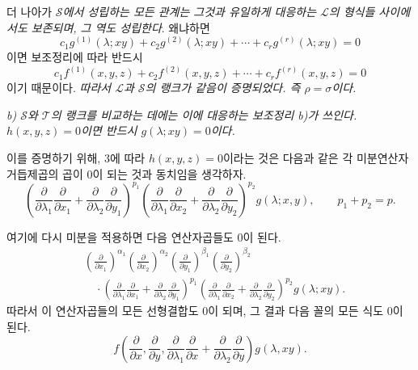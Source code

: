 더 나아가 \emph{$\mathcal S$에서 성립하는 모든 관계는 그것과 유일하게 대응하는 $\mathcal L$의 형식들 사이에서도 보존되며, 그 역도 성립한다}. 왜냐하면
\[
  c_1g^{(1)}(\lambda;xy)+c_2g^{(2)}(\lambda;xy)+\cdots+c_rg^{(r)}(\lambda;xy)=0
\]
이면 보조정리에 따라 반드시
\[
  c_1f^{(1)}(x,y,z)+c_2f^{(2)}(x,y,z)+\cdots+c_rf^{(r)}(x,y,z)=0
\]
이기 때문이다. \emph{따라서 $\mathcal L$과 $\mathcal S$의 랭크가 같음이 증명되었다. 즉 $\rho=\sigma$이다.}

\emph{b) $\mathcal S$와 $\mathcal T$의 랭크를 비교하는 데에는 이에 대응하는 보조정리 b)가 쓰인다. $h(x,y,z)=0$이면 반드시 $g(\lambda;xy)=0$이다.}

이를 증명하기 위해, 3에 따라 $h(x,y,z)=0$이라는 것은 다음과 같은 각 미분연산자 거듭제곱의 곱이 0이 되는 것과 동치임을 생각하자.
\[
 \left(\frac{\partial}{\partial\lambda_1}\frac{\partial}{\partial x_1}
 +\frac{\partial}{\partial\lambda_2}\frac{\partial}{\partial y_1}\right)^{p_1}
 \left(\frac{\partial}{\partial\lambda_1}\frac{\partial}{\partial x_2}
 +\frac{\partial}{\partial\lambda_2}\frac{\partial}{\partial y_2}\right)^{p_2}g(\lambda;x,y),
 \qquad p_1+p_2=p.
\]

여기에 다시 미분을 적용하면 다음 연산자곱들도 0이 된다.
\[
\begin{aligned}
&\left(\frac{\partial}{\partial x_1}\right)^{\alpha_1}
 \left(\frac{\partial}{\partial x_2}\right)^{\alpha_2}
 \left(\frac{\partial}{\partial y_1}\right)^{\beta_1}
 \left(\frac{\partial}{\partial y_2}\right)^{\beta_2} \\
&\quad\cdot
 \left(\frac{\partial}{\partial\lambda_1}\frac{\partial}{\partial x_1}
 +\frac{\partial}{\partial\lambda_2}\frac{\partial}{\partial y_1}\right)^{p_1}
 \left(\frac{\partial}{\partial\lambda_1}\frac{\partial}{\partial x_2}
 +\frac{\partial}{\partial\lambda_2}\frac{\partial}{\partial y_2}\right)^{p_2}
 g(\lambda;xy).
\end{aligned}
\]
따라서 이 연산자곱들의 모든 선형결합도 0이 되며, 그 결과 다음 꼴의 모든 식도 0이 된다.
\[
  f\left(\frac{\partial}{\partial x},\frac{\partial}{\partial y},
  \frac{\partial}{\partial\lambda_1}\frac{\partial}{\partial x}
  +\frac{\partial}{\partial\lambda_2}\frac{\partial}{\partial y}\right)g(\lambda,xy).
\]

